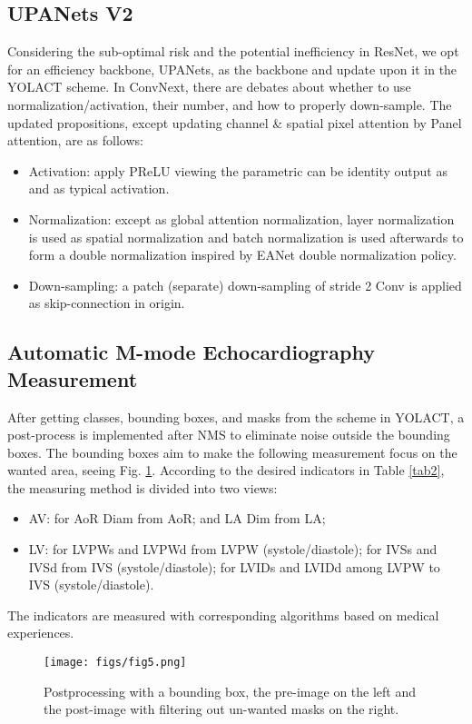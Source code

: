 \documentclass{article}
\begin{document}
\subsection{UPANets V2}
\label{sec4.2}
Considering the sub-optimal risk and the potential inefficiency in ResNet, we opt for an efficiency backbone, UPANets, as the backbone and update upon it in the YOLACT scheme. In ConvNext, there are debates about whether to use normalization/activation, their number, and how to properly down-sample. The updated propositions, except updating channel \& spatial pixel attention by Panel attention, are as follows:
\begin{itemize}
    \item Activation: apply PReLU viewing the parametric can be identity output as  and  as typical activation. 
    \item Normalization: except  as global attention normalization, layer normalization is used as spatial normalization and batch normalization is used afterwards to form a double normalization inspired by EANet double normalization policy.
    \item Down-sampling: a patch (separate) down-sampling of stride 2 Conv  is applied as skip-connection in origin. 
\end{itemize}

\subsection{Automatic M-mode Echocardiography Measurement}
\label{sec4.3}
After getting classes, bounding boxes, and masks from the scheme in YOLACT, a post-process is implemented after NMS to eliminate noise outside the bounding boxes. The bounding boxes aim to make the following measurement focus on the wanted area, seeing Fig. \ref{fig5}. According to the desired indicators in Table \ref{tab2}, the measuring method is divided into two views:
\begin{itemize}
    \item AV: for AoR Diam from AoR; and LA Dim from LA;
    \item LV: for LVPWs and LVPWd from LVPW (systole/diastole); for IVSs and IVSd from IVS (systole/diastole); for LVIDs and LVIDd among LVPW to IVS (systole/diastole).
\end{itemize}
The indicators are measured with corresponding algorithms based on medical experiences.

\begin{figure}[!t]
    \centering
    \texttt{[image: figs/fig5.png]}
    \caption{Postprocessing with a bounding box, the pre-image on the left and the post-image with filtering out un-wanted masks on the right.}
    \label{fig5}
\end{figure}
\end{document}

